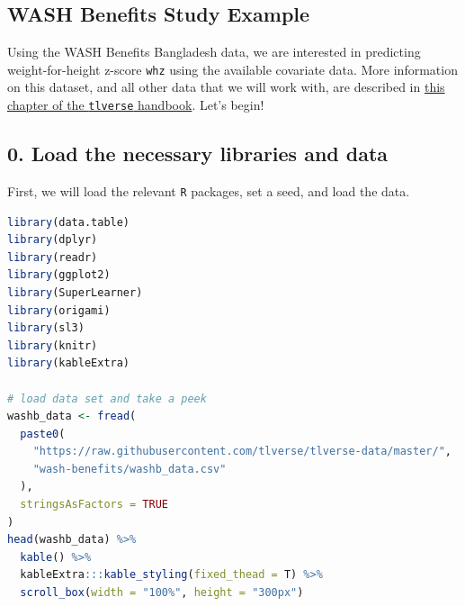 \documentclass[
  12pt, krantz2,
]{krantz}
\newcommand{\passthrough}[1]{#1}
\theoremstyle{definition}
\theoremstyle{definition}
\theoremstyle{definition}
\newcommand{\1}{\mathbbm{1}}
\begin{document}
\hypertarget{wash-benefits-study-example-1}{%
\subsection*{WASH Benefits Study Example}\label{wash-benefits-study-example-1}}


Using the WASH Benefits Bangladesh data, we are interested in predicting
weight-for-height z-score \passthrough{\lstinline!whz!} using the available covariate data. More
information on this dataset, and all other data that we will work with, are
described in \href{ihttps://tlverse.org/tlverse-handbook/data.html}{this chapter of the \passthrough{\lstinline!tlverse!}
handbook}. Let's begin!

\hypertarget{load-the-necessary-libraries-and-data}{%
\subsection*{0. Load the necessary libraries and data}\label{load-the-necessary-libraries-and-data}}


First, we will load the relevant \passthrough{\lstinline!R!} packages, set a seed, and load the data.

\begin{lstlisting}[language=R]
library(data.table)
library(dplyr)
library(readr)
library(ggplot2)
library(SuperLearner)
library(origami)
library(sl3)
library(knitr)
library(kableExtra)

# load data set and take a peek
washb_data <- fread(
  paste0(
    "https://raw.githubusercontent.com/tlverse/tlverse-data/master/",
    "wash-benefits/washb_data.csv"
  ),
  stringsAsFactors = TRUE
)
head(washb_data) %>%
  kable() %>%
  kableExtra:::kable_styling(fixed_thead = T) %>%
  scroll_box(width = "100%", height = "300px")
\end{lstlisting}
\end{document}
